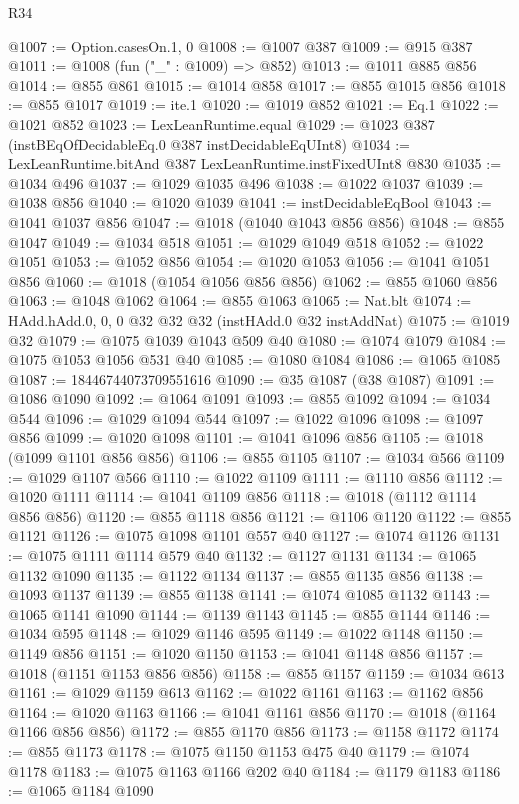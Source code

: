 \begin{lexlean}{R34}
\begin{coremodule}
@1007 := Option.casesOn.{1, 0}
@1008 := @1007 @387
@1009 := @915 @387
@1011 := @1008 (fun ("_" : @1009) => @852)
@1013 := @1011 @885 @856
@1014 := @855 @861
@1015 := @1014 @858
@1017 := @855 @1015 @856
@1018 := @855 @1017
@1019 := ite.{1}
@1020 := @1019 @852
@1021 := Eq.{1}
@1022 := @1021 @852
@1023 := LexLeanRuntime.equal
@1029 := @1023 @387 (instBEqOfDecidableEq.{0} @387 instDecidableEqUInt8)
@1034 := LexLeanRuntime.bitAnd @387 LexLeanRuntime.instFixedUInt8 @830
@1035 := @1034 @496
@1037 := @1029 @1035 @496
@1038 := @1022 @1037
@1039 := @1038 @856
@1040 := @1020 @1039
@1041 := instDecidableEqBool
@1043 := @1041 @1037 @856
@1047 := @1018 (@1040 @1043 @856 @856)
@1048 := @855 @1047
@1049 := @1034 @518
@1051 := @1029 @1049 @518
@1052 := @1022 @1051
@1053 := @1052 @856
@1054 := @1020 @1053
@1056 := @1041 @1051 @856
@1060 := @1018 (@1054 @1056 @856 @856)
@1062 := @855 @1060 @856
@1063 := @1048 @1062
@1064 := @855 @1063
@1065 := Nat.blt
@1074 := HAdd.hAdd.{0, 0, 0} @32 @32 @32 (instHAdd.{0} @32 instAddNat)
@1075 := @1019 @32
@1079 := @1075 @1039 @1043 @509 @40
@1080 := @1074 @1079
@1084 := @1075 @1053 @1056 @531 @40
@1085 := @1080 @1084
@1086 := @1065 @1085
@1087 := 18446744073709551616
@1090 := @35 @1087 (@38 @1087)
@1091 := @1086 @1090
@1092 := @1064 @1091
@1093 := @855 @1092
@1094 := @1034 @544
@1096 := @1029 @1094 @544
@1097 := @1022 @1096
@1098 := @1097 @856
@1099 := @1020 @1098
@1101 := @1041 @1096 @856
@1105 := @1018 (@1099 @1101 @856 @856)
@1106 := @855 @1105
@1107 := @1034 @566
@1109 := @1029 @1107 @566
@1110 := @1022 @1109
@1111 := @1110 @856
@1112 := @1020 @1111
@1114 := @1041 @1109 @856
@1118 := @1018 (@1112 @1114 @856 @856)
@1120 := @855 @1118 @856
@1121 := @1106 @1120
@1122 := @855 @1121
@1126 := @1075 @1098 @1101 @557 @40
@1127 := @1074 @1126
@1131 := @1075 @1111 @1114 @579 @40
@1132 := @1127 @1131
@1134 := @1065 @1132 @1090
@1135 := @1122 @1134
@1137 := @855 @1135 @856
@1138 := @1093 @1137
@1139 := @855 @1138
@1141 := @1074 @1085 @1132
@1143 := @1065 @1141 @1090
@1144 := @1139 @1143
@1145 := @855 @1144
@1146 := @1034 @595
@1148 := @1029 @1146 @595
@1149 := @1022 @1148
@1150 := @1149 @856
@1151 := @1020 @1150
@1153 := @1041 @1148 @856
@1157 := @1018 (@1151 @1153 @856 @856)
@1158 := @855 @1157
@1159 := @1034 @613
@1161 := @1029 @1159 @613
@1162 := @1022 @1161
@1163 := @1162 @856
@1164 := @1020 @1163
@1166 := @1041 @1161 @856
@1170 := @1018 (@1164 @1166 @856 @856)
@1172 := @855 @1170 @856
@1173 := @1158 @1172
@1174 := @855 @1173
@1178 := @1075 @1150 @1153 @475 @40
@1179 := @1074 @1178
@1183 := @1075 @1163 @1166 @202 @40
@1184 := @1179 @1183
@1186 := @1065 @1184 @1090

\end{coremodule}
\end{lexlean}
